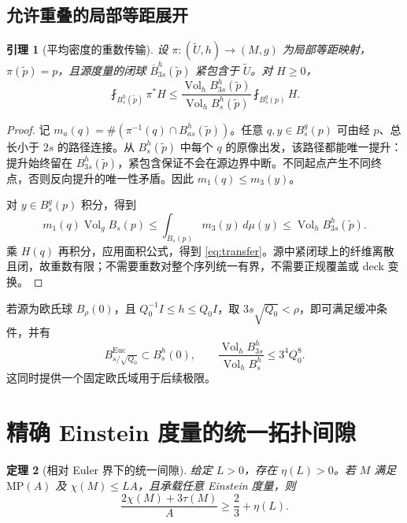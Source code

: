 \documentclass[UTF8,fontset=fandol,zihao=-4]{ctexart}
\theoremstyle{cn}
\newtheorem{theorem}{定理}[section]
\newtheorem{lemma}[theorem]{引理}
\DeclareMathOperator{\Vol}{Vol}
\newcommand{\dd}{\,d\mu}
\newcommand{\av}{\fint}
\numberwithin{equation}{section}
\begin{document}
\subsection{允许重叠的局部等距展开}

\begin{lemma}[平均密度的重数传输]\label{lem:transfer}
设 $\pi:(\widetilde U,h)\to(M,g)$ 为局部等距映射，$\pi(\tilde p)=p$，且源度量的闭球 $\overline B^h_{3s}(\tilde p)$ 紧包含于 $\widetilde U$。对 $H\ge0$，
\begin{equation}\label{eq:transfer}
\av_{B_s^h(\tilde p)}\pi^*H
\le\frac{\Vol_h B_{3s}^h(\tilde p)}{\Vol_h B_s^h(\tilde p)}\av_{B_s^g(p)}H.
\end{equation}
\end{lemma}
\begin{proof}
记 $m_a(q)=\#(\pi^{-1}(q)\cap B_{as}^h(\tilde p))$。任意 $q,y\in B_s^g(p)$ 可由经 $p$、总长小于 $2s$ 的路径连接。从 $B_s^h(\tilde p)$ 中每个 $q$ 的原像出发，该路径都能唯一提升：提升始终留在 $B_{3s}^h(\tilde p)$，紧包含保证不会在源边界中断。不同起点产生不同终点，否则反向提升的唯一性矛盾。因此 $m_1(q)\le m_3(y)$。

对 $y\in B_s^g(p)$ 积分，得到
\[
m_1(q)\Vol_gB_s(p)\le\int_{B_s(p)}m_3(y)\dd(y)
\le\Vol_hB_{3s}^h(\tilde p).
\]
乘 $H(q)$ 再积分，应用面积公式，得到 \eqref{eq:transfer}。源中紧闭球上的纤维离散且闭，故重数有限；不需要重数对整个序列统一有界，不需要正规覆盖或 deck 变换。
\end{proof}

若源为欧氏球 $B_\rho(0)$，且 $Q_0^{-1}I\le h\le Q_0I$，取 $3s\sqrt{Q_0}<\rho$，即可满足缓冲条件，并有
\[
B^{\mathrm{Euc}}_{s/\sqrt{Q_0}}\subset B_s^h(0),\qquad
\frac{\Vol_hB_{3s}^h}{\Vol_hB_s^h}\le3^4Q_0^8.
\]
这同时提供一个固定欧氏域用于后续极限。

\section{精确 Einstein 度量的统一拓扑间隙}

\begin{theorem}[相对 Euler 界下的统一间隙]\label{thm:exact}
给定 $L>0$，存在 $\eta(L)>0$。若 $M$ 满足 $\mathrm{MP}(A)$ 及 $\chi(M)\le LA$，且承载任意 Einstein 度量，则
\begin{equation}\label{eq:exact-gap}
\frac{2\chi(M)+3\tau(M)}A\ge\frac23+\eta(L).
\end{equation}
\end{theorem}
\end{document}
